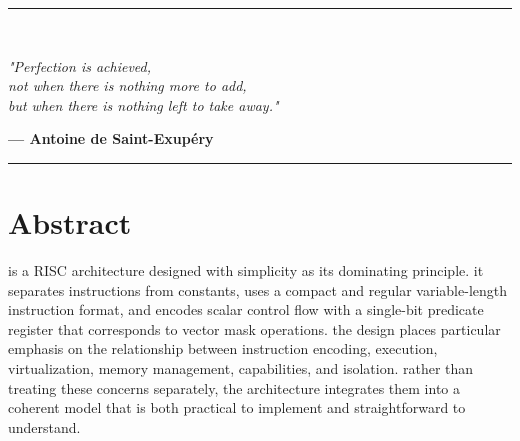 \clearpage
\thispagestyle{empty}
\vspace*{0.10\textheight}
\begin{center}
\noindent\rule{\textwidth}{0.5pt}\\
\begin{flushleft}
\hspace*{1.25em}\emph{"Perfection is achieved,}\\
\hspace*{1.5em}\emph{not when there is nothing more to add,}\\
\hspace*{1.5em}\emph{but when there is nothing left to take away."}
\end{flushleft}
\begin{flushright}
\textbf{— Antoine de Saint-Exupéry}\hspace*{1.5em}
\end{flushright}
\vspace{-3mm}
\noindent\rule{\textwidth}{0.5pt}
\end{center}

\chapter*{Abstract}

\arch{} is a RISC architecture designed with simplicity as its dominating
principle. it separates instructions from constants, uses a compact and
regular variable-length instruction format, and encodes scalar control
flow with a single-bit predicate register that corresponds to vector
mask operations. the design places particular emphasis on the relationship
between instruction encoding, execution, virtualization, memory management,
capabilities, and isolation. rather than treating these concerns separately,
the architecture integrates them into a coherent model that is both
practical to implement and straightforward to understand.

\vspace{10em}

